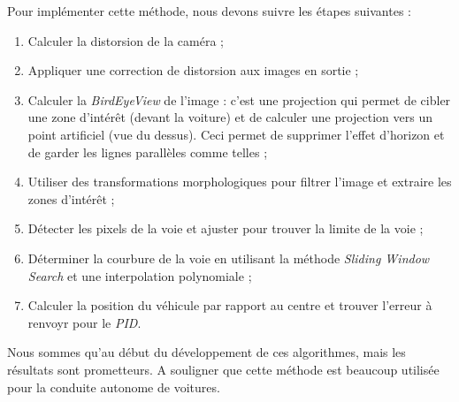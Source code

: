 \documentclass[12pt, openany]{report}
\begin{document}
Pour implémenter cette méthode, nous devons suivre les étapes suivantes :
\begin{enumerate}
    \item Calculer la distorsion de la caméra ;
    \item Appliquer une correction de distorsion aux images en sortie ;
    \item Calculer la \emph{BirdEyeView} de l'image : c'est une projection qui permet de cibler une zone d'intérêt (devant la voiture) et de calculer une projection vers un point artificiel (vue du dessus). Ceci permet de supprimer l'effet d'horizon et de garder les lignes parallèles comme telles ;
    \item Utiliser des transformations morphologiques pour filtrer l'image et extraire les zones d'intérêt ;
    \item Détecter les pixels de la voie et ajuster pour trouver la limite de la voie ;
    \item Déterminer la courbure de la voie en utilisant la méthode \emph{Sliding Window Search} et une interpolation polynomiale ;
    \item Calculer la position du véhicule par rapport au centre et trouver l'erreur à renvoyr pour le \emph{PID}. \\
\end{enumerate}

Nous sommes qu'au début du développement de ces algorithmes, mais les résultats sont prometteurs. A souligner que cette méthode est beaucoup utilisée pour la conduite autonome de voitures.
\end{document}
